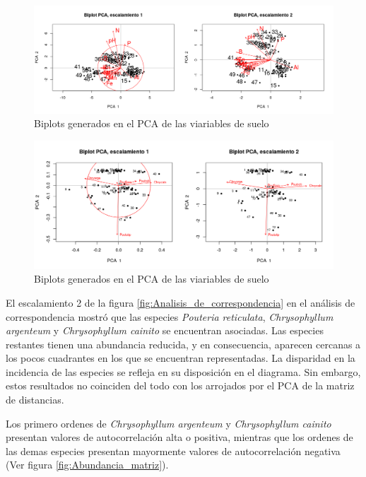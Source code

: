 \documentclass[11pt,]{article}
\begin{document}
\begin{figure}
\centering
\includegraphics[width=1.00000\textwidth]{Biplot_PCA_escalamiento_actualizado.png}
\caption{Biplots generados en el PCA de las viariables de suelo
\label{fig:Biplot_PCA_escalamiento}}
\end{figure}

\begin{figure}
\centering
\includegraphics[width=1.00000\textwidth]{PCA_comunidad_actualizado.png}
\caption{Biplots generados en el PCA de las viariables de suelo
\label{fig:PCA_comunidad}}
\end{figure}

El escalamiento 2 de la figura \ref{fig:Analisis_de_correspondencia} en
el análisis de correspondencia mostró que las especies \emph{Pouteria
reticulata}, \emph{Chrysophyllum argenteum} y \emph{Chrysophyllum
cainito} se encuentran asociadas. Las especies restantes tienen una
abundancia reducida, y en consecuencia, aparecen cercanas a los pocos
cuadrantes en los que se encuentran representadas. La disparidad en la
incidencia de las especies se refleja en su disposición en el diagrama.
Sin embargo, estos resultados no coinciden del todo con los arrojados
por el PCA de la matriz de distancias.

Los primero ordenes de \emph{Chrysophyllum argenteum} y
\emph{Chrysophyllum cainito} presentan valores de autocorrelación alta o
positiva, mientras que los ordenes de las demas especies presentan
mayormente valores de autocorrelación negativa (Ver figura
\ref{fig:Abundancia_matriz}).
\end{document}
